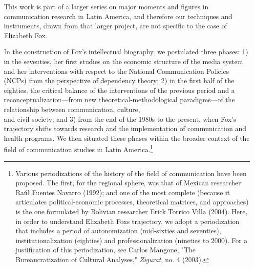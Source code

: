 \documentclass{tufte-handout}
\begin{document}
This work is part of a larger series on major moments and figures in
communication research in Latin America, and therefore our techniques
and instruments, drawn from that larger project, are not specific to the
case of Elizabeth Fox.

In the construction of Fox's intellectual biography, we postulated three
phases: 1) in the seventies, her first studies on the economic structure
of the media system and her interventions with respect to the National
Communication Policies (NCPs) from the perspective of dependency theory;
2) in the first half of the eighties, the critical balance of the
interventions of the previous period and a reconceptualization---from
new theoretical-methodological paradigms---of the relationship between
communication, culture,\\\noindent and civil society; and 3) from the end of the
1980s to the present, when Fox's trajectory shifts towards research and
the implementation of communication and health programs. We then
situated these phases within the broader context of the field of
communication studies in Latin America.\footnote{Various periodizations
  of the history of the field of communication have been proposed. The
  first, for the regional sphere, was that of Mexican researcher Raúl
  Fuentes Navarro (1992); and one of the most complete (because it
  articulates political-economic processes, theoretical matrices, and
  approaches) is the one formulated by Bolivian researcher Erick Torrico
  Villa (2004). Here, in order to understand Elizabeth
  Fox\textquotesingle s trajectory, we adopt a periodization that
  includes a period of autonomization (mid-sixties and seventies),
  institutionalization (eighties) and professionalization (nineties to
  2000). For a justification of this periodization, see Carlos Mangone,
  "The Bureaucratization of Cultural Analyses," \emph{Zigurat}, no. 4
  (2003).}
\end{document}

